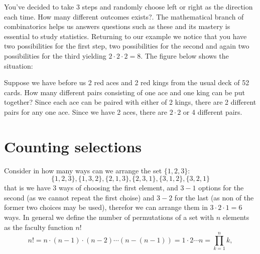You've decided to take $3$ steps and randomly choose left or right as the direction each time. How many different outcomes exists?. The mathematical branch of combinatorics helps us answers questions such as these and its mastery is essential to study statistics. Returning to our example we notice that you have two possibilities for the first step, two possibilities for the second and again two possibilities for the third yielding $2 \cdot 2 \cdot 2 = 8$. The figure below shows the situation:
\begin{figure}[H]
\centering
{}
\end{figure}

Suppose we have before us 2 red aces and 2 red kings from the usual deck of 52 cards. How many different pairs consisting of one ace and one king can be put together? Since each ace can be paired with either of 2 kings, there are 2
different pairs for any one ace. Since we have 2 aces, there are $2 \cdot 2$
or 4 different pairs.

\section{Counting selections}
Consider in how many ways can we arrange the set $\{1,2,3\}$:
\[
\{1, 2, 3\}, \{1, 3, 2\}, \{2, 1, 3\}, \{2, 3, 1\}, \{3, 1, 2\}, \{3, 2, 1\}
\]
that is we have $3$ ways of choosing the first element, and $3-1$ options for
the second (as we cannot repeat the first choise) and $3-2$ for the last (as
non of the former two choices may be used), therefor we can arrange them in
$3 \cdot 2 \cdot 1 = 6$ ways. In general we define the number of permutations
of a set with $n$ elements as the faculty function $n!$
\[
n! = n \cdot (n-1) \cdot (n-2) \cdots  (n - (n -1)) = 1 \cdot 2 \cdots n = \prod_{k=1}^{n}k,
\]

